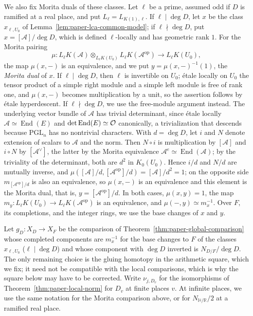 We also fix Morita duals of these classes.
Let $\ell$ be a prime, assumed odd if $D$ is ramified at a real place, and put $L_\ell=L_{K(1),\ell}$.
If $\ell\mid\deg D$, let $x$ be the class $x_{\ell,U_0}$ of Lemma~\ref{lem:paper-lca-common-model}; if $\ell\nmid\deg D$, put $x=[\mathcal A]/\deg D$, which is defined $\ell$-locally and has geometric rank $1$.
For the Morita pairing
\[
 \mu\colon L_\ell K(\mathcal A)\otimes_{L_\ell K(U_0)}L_\ell K(\mathcal A^{\mathrm{op}})\longrightarrow L_\ell K(U_0),
\]
the map $\mu(x,-)$ is an equivalence, and we put $y=\mu(x,-)^{-1}(1)$, the \emph{Morita dual} of $x$.
If $\ell\mid\deg D$, then $\ell$ is invertible on $U_0$; \'etale locally on $U_0$ the tensor product of a simple right module and a simple left module is free of rank one, and $\mu(x,-)$ becomes multiplication by a unit, so the assertion follows by \'etale hyperdescent.
If $\ell\nmid\deg D$, we use the free-module argument instead.
The underlying vector bundle of $\mathcal A$ has trivial determinant, since \'etale locally $\mathcal A\simeq\operatorname{End}(E)$ and $\det\operatorname{End}(E)\simeq\mathcal O$ canonically, a trivialization that descends because $\mathrm{PGL}_n$ has no nontrivial characters.
With $d=\deg D$, let $i$ and $N$ denote extension of scalars to $\mathcal A$ and the norm.
Then $N\circ i$ is multiplication by $[\mathcal A]$ and $i\circ N$ by $[\mathcal A^\vee]$, the latter by the Morita equivalence $\mathcal A^e\simeq\operatorname{End}(\mathcal A)$; by the triviality of the determinant, both are $d^2$ in $K_0(U_0)$.
Hence $i/d$ and $N/d$ are mutually inverse, and $\mu([\mathcal A]/d,[\mathcal A^{\mathrm{op}}]/d)=[\mathcal A]/d^2=1$; on the opposite side $m_{[\mathcal A^{\mathrm{op}}]/d}$ is also an equivalence, so $\mu(x,-)$ is an equivalence and this element is the Morita dual, that is, $y=[\mathcal A^{\mathrm{op}}]/d$.
In both cases, $\mu(x,y)=1$, the map $m_y\colon L_\ell K(U_0)\to L_\ell K(\mathcal A^{\mathrm{op}})$ is an equivalence, and $\mu(-,y)\simeq m_x^{-1}$.
Over $F$, its completions, and the integer rings, we use the base changes of $x$ and $y$.

Let $g_D\colon X_D\to X_F$ be the comparison of Theorem~\ref{thm:paper-global-comparison} whose completed components are $m_x^{-1}$ for the base changes to $F$ of the classes $x_{\ell,U_0}$ ($\ell\mid\deg D$) and whose component with $\deg D$ inverted is $N_{D/F}/\deg D$.
The only remaining choice is the gluing homotopy in the arithmetic square, which we fix; it need not be compatible with the local comparisons, which is why the square below may have to be corrected.
Write $\nu_{j,D_v}$ for the isomorphisms of Theorem~\ref{thm:paper-local-norm} for $D_v$ at finite places $v$.
At infinite places, we use the same notation for the Morita comparison above, or for $N_{\mathbb H/\mathbb R}/2$ at a ramified real place.


